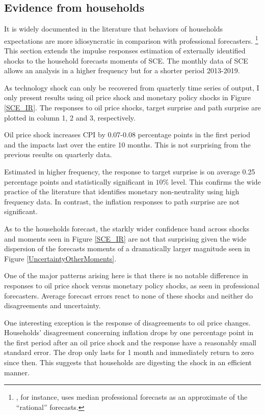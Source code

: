 \documentclass[12pt]{article}
\begin{document}
	\subsection{Evidence from households}
	
	It is widely documented in the literature that behaviors of households expectations are more idiosyncratic in comparison with professional forecasters. \footnote{\cite{carroll2003macroeconomic}, for instance, uses median professional forecasts as an approximate of the ``rational'' forecasts.} This section extends the impulse responses estimation of externally identified shocks to the household forecasts moments of SCE.  The monthly data of SCE allows an analysis in a higher frequency but for a shorter period 2013-2019. 
	
	As technology shock can only be recovered from quarterly time series of output, I only present results using oil price shock and monetary policy shocks in Figure \ref{SCE_IR}. The responses to oil price shocks, target surprise and path surprise are plotted in column 1, 2 and 3, respectively. 
	
	Oil price shock increases CPI by 0.07-0.08 percentage points in the first period and the impacts last over the entire 10 months. This is not surprising from the previous results on quarterly data. 
	
	Estimated in higher frequency, the response to target surprise is on average 0.25 percentage points and statistically significant in $10\%$ level. This confirms the wide practice of the literature that identifies monetary non-neutrality using high frequency data. In contrast, the inflation responses to path surprise are not significant. 
	
	As to the households forecast, the starkly wider confidence band across  shocks and moments seen in Figure \ref{SCE_IR} are not that surprising given the wide dispersion of the forecasts moments of a dramatically larger magnitude seen in Figure \ref{UncertaintyOtherMoments}.  
	
	One of the major patterns arising here is that there is no notable difference in responses to oil price shock versus monetary policy shocks, as seen in professional forecasters.  Average forecast errors react to none of these shocks and neither do disagreements and uncertainty.  
	
	One interesting exception is the response of disagreements to oil price changes. Households' disagreement concerning inflation drops by one percentage point in the first period after an oil price shock and the response have a reasonably small standard error. The drop only lasts for 1 month and immediately return to zero since then. This suggests that households are digesting the shock in an efficient manner.  
	
\end{document}
